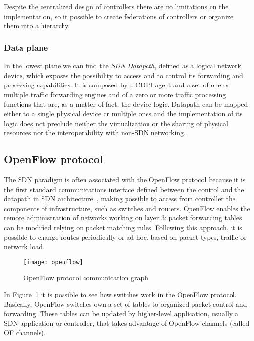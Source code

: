Despite the centralized design of controllers there are no limitations on the
implementation, so it possible to create federations of controllers or organize
them into a hierarchy.

\subsubsection{Data plane}
In the lowest plane we can find the \emph{SDN Datapath}, defined as a logical
network device, which exposes the possibility to access and to control its
forwarding and processing capabilities. It is composed by a CDPI agent and a set
of one or multiple traffic forwarding engines and of a zero or more traffic
processing functions that are, as a matter of fact, the device logic. Datapath
can be mapped either to a single physical device or multiple ones and the
implementation of its logic does not preclude neither the virtualization or
the sharing of physical resources nor the interoperability with non-SDN
networking.

\subsection{OpenFlow protocol}
The SDN paradigm is often associated with the OpenFlow protocol because it is
the first standard communications interface defined between the control and the
datapath in SDN architecture~\cite{fundation2013software}, making possible to
access from controller the components of infrastructure, such as switches and
routers. OpenFlow enables the remote administration of networks working on 
layer 3: packet forwarding tables can be modified relying on packet matching 
rules. Following this approach, it is possible to change routes periodically or 
ad-hoc, based on packet types, traffic or network load.

\begin{figure}[t]
 \centering
 \texttt{[image: openflow]}
 \caption{OpenFlow protocol communication graph}
 \label{chap:background:img:openflow_protocol}
\end{figure}

In Figure~\ref{chap:background:img:openflow_protocol} it is possible to see
how switches work in the OpenFlow protocol. Basically, OpenFlow switches own a
set of tables to organized packet control and forwarding. These tables can be
updated by higher-level application, usually a SDN application or controller,
that takes advantage of OpenFlow channels (called OF channels). 

